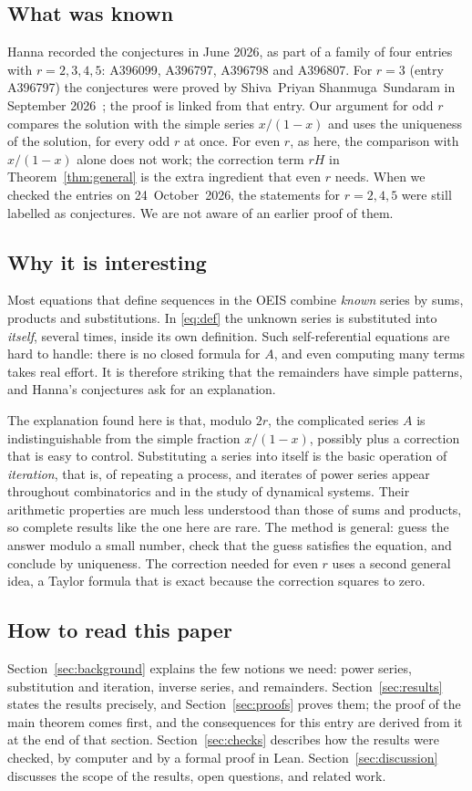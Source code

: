 \documentclass[11pt,a4paper]{article}
\theoremstyle{definition}
\theoremstyle{remark}
\begin{document}
\subsection{What was known}
Hanna recorded the conjectures in June 2026, as part of a family of four entries with $r=2,3,4,5$:
A396099, A396797, A396798 and A396807. For $r=3$ (entry A396797) the conjectures were proved by Shiva~Priyan
Shanmuga~Sundaram in September 2026~\cite{sundaram}; the proof is linked from that entry. Our argument for odd $r$ compares
the solution with the simple series $x/(1-x)$ and uses the uniqueness of the solution, for every odd $r$ at
once. For even $r$, as here, the comparison with $x/(1-x)$ alone does not work; the correction term $rH$ in
Theorem~\ref{thm:general} is the extra ingredient that even $r$ needs. When we checked the entries on
24~October~2026, the statements for $r=2,4,5$ were still labelled as conjectures. We are not aware of an earlier proof
of them.

\subsection{Why it is interesting}
Most equations that define sequences in the OEIS combine \emph{known} series by sums, products and substitutions.
In \eqref{eq:def} the unknown series is substituted into \emph{itself}, several times, inside its own definition.
Such self-referential equations are hard to handle: there is no closed formula for $A$, and even computing many terms
takes real effort. It is therefore striking that the remainders have simple patterns, and Hanna's conjectures ask
for an explanation.

The explanation found here is that, modulo $2r$, the complicated series $A$ is indistinguishable from the simple
fraction $x/(1-x)$, possibly plus a correction that is easy to control. Substituting a series into itself is the
basic operation of \emph{iteration}, that is, of repeating a process, and iterates of power series appear throughout
combinatorics and in the study of dynamical systems. Their arithmetic properties are much less understood than those
of sums and products, so complete results like the one here are rare. The method is general: guess the answer modulo
a small number, check that the guess satisfies the equation, and conclude by uniqueness. The correction needed for
even $r$ uses a second general idea, a Taylor formula that is exact because the correction squares to zero.

\subsection{How to read this paper}
Section~\ref{sec:background} explains the few notions we need: power series, substitution and iteration, inverse
series, and remainders. Section~\ref{sec:results} states the results precisely, and Section~\ref{sec:proofs} proves
them; the proof of the main theorem comes first, and the consequences for this entry are derived from it at the end of
that section. Section~\ref{sec:checks} describes how the results were checked, by computer and by a formal proof in
Lean. Section~\ref{sec:discussion} discusses the scope of the results, open questions, and related work.
\end{document}
